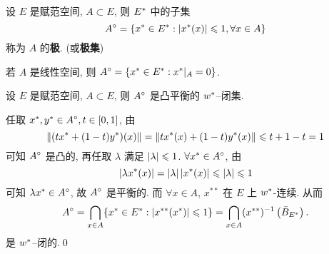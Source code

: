 	\begin{Definition}[极]\label{def:极}
		设 $ E $ 是赋范空间, $ A\subset E $, 则 $ E^{*} $ 中的子集
		\[
			A^{\circ} = \{ x^{*}\in E^{*}:\left| x^{*}(x) \right| \leqslant1, \forall x\in A \}
		\]
		称为 $ A $ 的\textbf{极}. (或\textbf{极集})
	\end{Definition}

	\begin{Remark}
		若 $ A $ 是线性空间, 则 $ A^{\circ}=\{ x^{*}\in E^{*}:x^{*}|_{A}=0 \} $.
	\end{Remark}
	\begin{Proposition}\label{prop:极的w*闭性}
		设 $ E $ 是赋范空间, $ A\subset E $, 则 $ A^{\circ} $ 是凸平衡的 $ w^{*} $--闭集.
	\end{Proposition}
	\begin{Proof}
		任取 $ x^{*}, y^{*}\in A^{\circ}, t\in[0, 1] $, 由
		\[
			\left\| (tx^{*}+(1-t)y^{*})(x) \right\|=\left\| tx^{*}(x)+(1-t)y^{*}(x) \right\|\leqslant t+1-t=1
		\]
		可知 $ A^{\circ} $ 是凸的, 再任取 $ \lambda $ 满足 $ \left| \lambda \right| \leqslant1 $. $ \forall x^{*}\in A^{\circ} $, 由
		\[
			\left| \lambda x^{*}(x) \right| =\left| \lambda \right| \left| x^{*}(x) \right| \leqslant\left| \lambda \right| \leqslant1
		\]
		可知 $ \lambda x^{*}\in A^{\circ} $, 故 $ A^{\circ} $ 是平衡的. 而 $ \forall x\in A $, $ x^{**} $ 在 $ E $ 上 $ w^{*} $-连续. 从而
		\[
			A^{\circ}=\bigcap_{x\in A}\{ x^{*}\in E^{*}:\left| x^{**}(x^{*}) \right| \leqslant1 \}=\bigcap_{x\in A}(x^{**})^{-1}\left( \bar{B}_{E^{*}} \right).
		\]
		是 $ w^{*} $--闭的.\qed
	\end{Proof}

